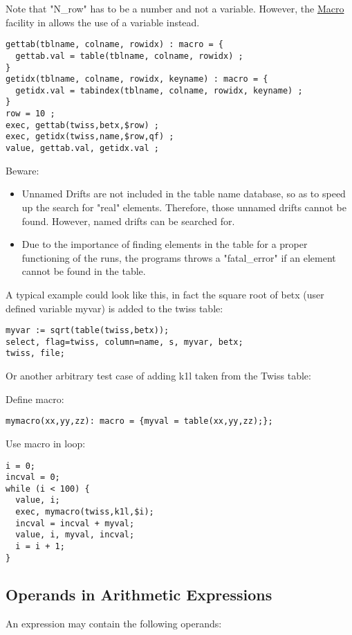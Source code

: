 Note that "N\_row" has to be a number and not a  variable. However, the
\hyperref[sec:macro]{Macro} facility in \madx allows
the use of a variable instead.   

\begin{verbatim}
gettab(tblname, colname, rowidx) : macro = {
  gettab.val = table(tblname, colname, rowidx) ;
}
getidx(tblname, colname, rowidx, keyname) : macro = {
  getidx.val = tabindex(tblname, colname, rowidx, keyname) ;
}
row = 10 ;
exec, gettab(twiss,betx,$row) ;
exec, getidx(twiss,name,$row,qf) ;
value, gettab.val, getidx.val ;
\end{verbatim}

Beware: 
\begin{itemize}
	\item  Unnamed Drifts are not included in the table name
	database, so as to speed up the search for "real"
	elements. Therefore, those  unnamed drifts cannot be
	found. However, named drifts can be searched for.  
	\item  Due to the importance of finding elements in the table
	for a proper functioning of the \madx runs, the programs
	throws a "fatal\_error" if an element cannot be found in the
	table.   
\end{itemize}

A typical example could look like this, in fact the square root of betx
(user defined variable myvar) is added to the twiss table:  
\begin{verbatim}
myvar := sqrt(table(twiss,betx));
select, flag=twiss, column=name, s, myvar, betx;
twiss, file;
\end{verbatim}

Or another arbitrary test case of adding k1l taken from the Twiss table: 

Define macro: 
\begin{verbatim}
mymacro(xx,yy,zz): macro = {myval = table(xx,yy,zz);};
\end{verbatim}

Use macro in loop: 
\begin{verbatim}
i = 0;
incval = 0;
while (i < 100) {
  value, i;
  exec, mymacro(twiss,k1l,$i);
  incval = incval + myval;
  value, i, myval, incval;                
  i = i + 1;
}
\end{verbatim}

\subsection{Operands in Arithmetic Expressions}
\label{subsec:operand}
An expression may contain the following operands:  

